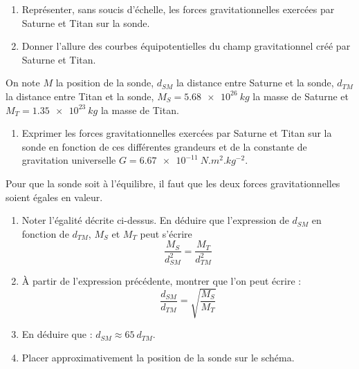 \documentclass[a4paper,fontsize=14pt,fleqn]{scrartcl}%
\begin{document}
\noindent \begin{minipage}{.3\linewidth}
    \centering
\end{minipage}
\begin{minipage}{.69\linewidth}
    \begin{enumerate}
        \item Représenter, sans soucis d'échelle, les forces gravitationnelles exercées par Saturne et Titan sur la sonde.
        \item Donner l'allure des courbes équipotentielles du champ gravitationnel créé par Saturne et Titan.
    \end{enumerate}
    On note $M$ la position de la sonde, $d_{SM}$ la distance entre Saturne et la sonde, $d_{TM}$ la distance entre Titan et la sonde, $M_S=\SI{5.68e26}{kg}$ la masse de Saturne et $M_T=\SI{1.35e23}{kg}$ la masse de Titan.
    \begin{enumerate}[resume]
        \item  Exprimer les forces gravitationnelles exercées par Saturne et Titan sur la sonde en fonction de ces différentes grandeurs et de la constante de gravitation universelle $G=\SI{6.67e-11}{N.m^{2}.kg^{-2}}$.
    \end{enumerate}
    Pour que la sonde soit à l'équilibre, il faut que les deux forces gravitationnelles soient égales en valeur.
    \begin{enumerate}[resume]
        \item Noter l'égalité décrite ci-dessus. En déduire que l'expression de $d_{SM}$ en fonction de $d_{TM}$, $M_S$ et $M_T$ peut s'écrire $$ \dfrac{M_S}{d_{SM}^2} = \dfrac{M_T}{d_{TM}^2}$$
        \item À partir de l'expression précédente, montrer que  l'on peut écrire : $$ \dfrac{d_{SM}}{d_{TM}} = \sqrt{\dfrac{M_S}{M_T}}$$
        \item En déduire que : $d_{SM} \approx \SI{65}{d_{TM}}$.
        \item Placer approximativement la position de la sonde sur le schéma.
    \end{enumerate}
\end{minipage}
\end{document}
